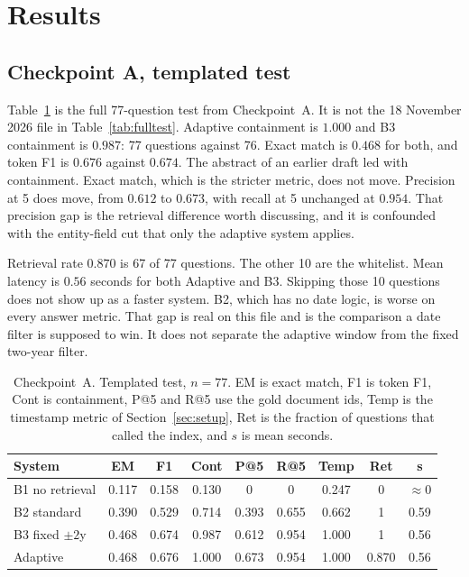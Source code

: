 \documentclass[11pt,letterpaper]{article}
\begin{document}
\section{Results}
\label{sec:results}

\subsection{Checkpoint A, templated test}

Table~\ref{tab:syn77} is the full 77-question test from Checkpoint~A.
It is not the 18 November 2026 file in Table~\ref{tab:fulltest}.
Adaptive containment is $1.000$ and B3 containment is $0.987$: 77 questions against 76.
Exact match is $0.468$ for both, and token F1 is $0.676$ against $0.674$.
The abstract of an earlier draft led with containment.
Exact match, which is the stricter metric, does not move.
Precision at 5 does move, from $0.612$ to $0.673$, with recall at 5 unchanged at $0.954$.
That precision gap is the retrieval difference worth discussing, and it is confounded with the entity-field cut that only the adaptive system applies.

Retrieval rate $0.870$ is 67 of 77 questions.
The other 10 are the whitelist.
Mean latency is $0.56$ seconds for both Adaptive and B3.
Skipping those 10 questions does not show up as a faster system.
B2, which has no date logic, is worse on every answer metric.
That gap is real on this file and is the comparison a date filter is supposed to win.
It does not separate the adaptive window from the fixed two-year filter.

\begin{table}[t]
\centering
\caption{Checkpoint~A. Templated test, $n{=}77$. EM is exact match, F1 is token F1, Cont is containment, P@5 and R@5 use the gold document ids, Temp is the timestamp metric of Section~\ref{sec:setup}, Ret is the fraction of questions that called the index, and $s$ is mean seconds.}
\label{tab:syn77}
\small
\begin{tabular}{lcccccccc}
\toprule
System & EM & F1 & Cont & P@5 & R@5 & Temp & Ret & s \\
\midrule
B1 no retrieval & 0.117 & 0.158 & 0.130 & 0 & 0 & 0.247 & 0 & $\approx 0$ \\
B2 standard & 0.390 & 0.529 & 0.714 & 0.393 & 0.655 & 0.662 & 1 & 0.59 \\
B3 fixed $\pm 2$y & 0.468 & 0.674 & 0.987 & 0.612 & 0.954 & 1.000 & 1 & 0.56 \\
Adaptive & 0.468 & 0.676 & 1.000 & 0.673 & 0.954 & 1.000 & 0.870 & 0.56 \\
\bottomrule
\end{tabular}
\end{table}
\end{document}
